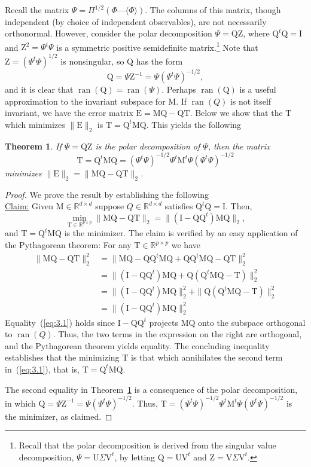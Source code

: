 \documentclass[12pt,letterpaper]{report}
\theoremstyle{plain}
\newtheorem{theorem}{Theorem}[chapter]
\theoremstyle{definition}
\newcounter{claim}
\theoremstyle{remark}
\numberwithin{theorem}{chapter}
\numberwithin{claim}{chapter}
\numberwithin{equation}{chapter}
\numberwithin{conjecture}{chapter}
\newcommand\R{\ensuremath{\mathbb{R}}}
\newcommand\M{\ensuremath{\mathrm{M}}}
\newcommand\T{\ensuremath{\mathrm{T}}}
\newcommand\I{\ensuremath{\mathrm{I}}}
\newcommand\Q{\ensuremath{\mathrm{Q}}}
\newcommand\Z{\ensuremath{\mathrm{Z}}}
\newcommand\E{\ensuremath{\mathrm{E}}}
\newcommand\U{\ensuremath{\mathrm{U}}}
\newcommand\V{\ensuremath{\mathrm{V}}}
\newcommand\ran{\ensuremath{\operatorname{ran}}}
\newcommand\<{\ensuremath{\langle}}
\renewcommand\>{\ensuremath{\rangle}}
\begin{document}
Recall the matrix $\Psi = \Pi^{1/2}(\Phi — \<\Phi\>)$. The columns of this
matrix, though independent (by choice of independent observables), are not
necessarily orthonormal. However, consider the polar decomposition 
$\Psi = \Q \Z$, where $\Q^t\Q = \I$ and $\Z^2 = \Psi^t\Psi$ is a symmetric
positive semidefinite matrix.\footnote{Recall that the polar decomposition is
  derived from the singular value decomposition, $\Psi = \U\Sigma \V^t$, by
  letting $\Q = \U \V^t$ and $\Z = \V\Sigma \V^t$.}
Note that $\Z = (\Psi^t\Psi)^{1/2}$ is nonsingular, so $\Q$ has the form
\[
\Q = \Psi \Z^{-1} = \Psi(\Psi^t\Psi)^{-1/2},
\]
and it is clear that $\ran(\Q) = \ran(\Psi)$. 
Perhaps $\ran(\Q)$ is a useful approximation to the invariant
subspace for $\M$. If $\ran(Q)$ is not itself invariant, we have the error 
matrix $\E =\M\Q - \Q\T$.  Below we show that the
$\T$ which minimizes $\|\E\|_2$ is $\T = \Q^t\M\Q$. 
This yields the following
\begin{theorem}
\label{thm:3.2.2}  
If $\Psi = \Q\Z$ is the polar decomposition of $\Psi$, then the matrix
\[
\T = \Q^t\M\Q = (\Psi^t\Psi)^{-1/2}\Psi^t \M^t \Psi (\Psi^t\Psi)^{-1/2}
\]
minimizes $\|\E\|_2 = \|\M\Q - \Q\T\|_2$.
\end{theorem}
\begin{proof}
We prove the result by establishing the following
\\[6pt]
\underline{Claim:} Given $\M \in \R^{d\times d}$ suppose $Q \in  \R^{d\times d}$
satisfies $\Q^t\Q =\I$. 
Then,
\[
\min_{\T\in \R^{p\times p}} \|\M\Q - \Q\T\|_2 = \|(\I- \Q\Q^t)\M\Q\|_2,
\]
and $\T = \Q^t\M\Q$ is the minimizer.
%
%
%
%
The claim is verified by an easy application of the Pythagorean theorem:
For any $\T \in \R^{p\times p}$ we have
\begin{align}
\label{eq:3.1}
\|\M\Q - \Q\T\|^2_2 &= \|\M\Q - \Q\Q^t\M\Q + \Q\Q^t\M\Q - \Q\T\|^2_2 \nonumber\\
&=\|(\I - \Q\Q^t)\M\Q + \Q(\Q^t\M\Q - \T)\|^2_2 \nonumber \\
&=\|(\I - \Q\Q^t)\M\Q\|^2_2 + \|\Q(\Q^t\M\Q - \T)\|^2_2 \\
&=\|(\I - \Q\Q^t)\M\Q\|^2_2 \nonumber
\end{align}
Equality~(\ref{eq:3.1}) holds since $\I - \Q\Q^t$ projects $\M\Q$ onto the
subspace orthogonal to 
$\ran(Q)$. Thus, the two terms in the expression on the right are orthogonal,
and the Pythagorean theorem yields equality. The concluding inequality
establishes that the minimizing $\T$ is that which annihilates the 
second term in~(\ref{eq:3.1}), that is, $\T = \Q^t\M\Q$.

The second equality in Theorem~\ref{thm:3.2.2} is a consequence of the polar decomposition, in
which $\Q = \Psi \Z^{-1} = \Psi(\Psi^t\Psi)^{-1/2}$. Thus,
$\T = (\Psi^t\Psi)^{-1/2}\Psi^t \M^t \Psi (\Psi^t\Psi)^{-1/2}$
is the minimizer, as claimed.
\end{proof}
\end{document}

